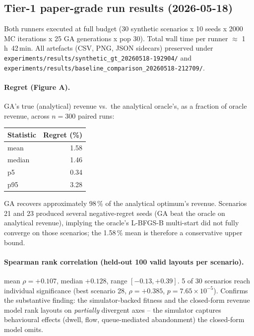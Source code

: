 \documentclass[11pt]{article}
\begin{document}
\subsection{Tier-1 paper-grade run results (2026-05-18)}

Both runners executed at full budget (30 synthetic scenarios x 10
seeds x 2000 MC iterations x 25 GA generations x pop 30). Total wall
time per runner $\approx$ 1\,h~42\,min. All artefacts (CSV, PNG,
JSON sidecars) preserved under
\texttt{experiments/results/synthetic\_gt\_20260518-192904/} and
\texttt{experiments/results/baseline\_comparison\_20260518-212709/}.

\paragraph{Regret (Figure A).}
GA's true (analytical) revenue vs.\ the analytical oracle's, as a
fraction of oracle revenue, across $n{=}300$ paired runs:

\begin{center}
\begin{tabular}{lr}
\hline
Statistic & Regret (\%) \\
\hline
mean      & 1.58 \\
median    & 1.46 \\
p5        & 0.34 \\
p95       & 3.28 \\
\hline
\end{tabular}
\end{center}

GA recovers approximately 98\,\% of the analytical optimum's
revenue. Scenarios 21 and 23 produced several negative-regret seeds
(GA beat the oracle on analytical revenue), implying the oracle's
L-BFGS-B multi-start did not fully converge on those scenarios; the
1.58\,\% mean is therefore a conservative upper bound.

\paragraph{Spearman rank correlation (held-out 100 valid layouts per
scenario).}
mean $\rho = +0.107$, median $+0.128$, range $[-0.13, +0.39]$. 5 of
30 scenarios reach individual significance (best scenario 28,
$\rho = +0.385$, $p = 7.65 \times 10^{-5}$). Confirms the
substantive finding: the simulator-backed fitness and the closed-form
revenue model rank layouts on \emph{partially} divergent axes -- the
simulator captures behavioural effects (dwell, flow, queue-mediated
abandonment) the closed-form model omits.
\end{document}
